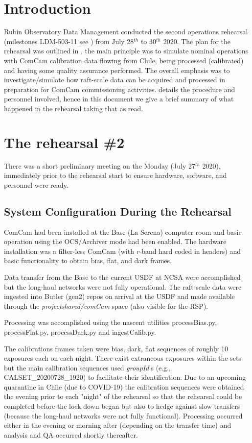 \section{Introduction} \label{sec:intro}

Rubin Observatory Data Management conducted the second operations rehearsal (milestones LDM-503-11 see ) from July 28$^{th}$ to 30$^{th}$ 2020.
The plan for the rehearsal was outlined in , the main principle was to simulate
nominal operations with ComCam calibration data flowing from Chile, being processed (calibrated)
and having some quality assurance performed.  The overall emphasis was to investigate/simulate how
raft-scale data can be acquired and processed in preparation for ComCam commissioning activities.
 details the procedure and personnel involved,
hence in this document we give a brief summary of what  happened in the rehearsal taking that as read.


\section{The rehearsal \#2}

There was a short preliminary meeting on the Monday (July 27$^{th}$ 2020), immediately prior to the
rehearsal start to ensure hardware, software, and personnel were ready.

\subsection{System Configuration During the Rehearsal} \label{sec:setup}

ComCam had been installed at the Base (La Serena) computer room and basic operation using the OCS/Archiver
mode had been enabled.  The hardware installation was a filter-less ComCam (with {\it r}-band hard coded
in headers) and basic functionality to obtain bias, flat, and dark frames.

Data transfer from the Base to the current USDF at NCSA were accomplished but the long-haul networks were not
fully operational.  The raft-scale data were ingested into Butler (gen2) repos on arrival at the USDF
and made available through the {\it \/project\/shared/comCam} space (also visible for the RSP).

Processing was accomplished using the nascent utilities processBias.py, processFlat.py, processDark.py
and ingestCalib.py.

The calibrations frames taken were bias, dark, flat sequences of roughly 10 exposures each on each night.
There exist extraneous exposures within the sets but the main calibration sequences used {\it groupId}'s
(e.g., CALSET\_20200728\_1920) to facilitate their identification.  Due to an upcoming quarantine in Chile
(due to COVID-19) the calibration sequences were obtained the evening prior to each "night" of the
rehearsal so that the rehearsal could be completed before the lock down began but also to hedge against
slow transfers (because the long-haul networks were not fully functional).  Processing occurred either
in the evening or morning after (depending on the transfer time) and analysis and QA occurred
shortly thereafter.

